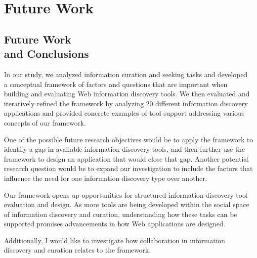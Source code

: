 \chapter{Future Work}
\label{chapter:future_work}

{\section{Future Work \\ and Conclusions }
In our study, we analyzed information curation and seeking tasks and developed a conceptual framework of factors and questions that are important when building and evaluating Web information discovery tools. We then evaluated and iteratively refined the framework by analyzing 20 different information discovery applications and provided concrete examples of tool support addressing various concepts of our framework.

One of the possible future research objectives would be to apply the framework to identify a gap in available information discovery tools, and then further use the framework to design an application that would close that gap. Another potential research question would be to expand our investigation to include the factors that influence the need for one information discovery type over another. 

Our framework opens up opportunities for structured information discovery tool evaluation and design. As more tools are being developed within the social space of information discovery and curation, understanding how these tasks can be supported promises advancements in how Web applications are designed.

Additionally, I would like to investigate how collaboration in information discovery and curation relates to the framework.

} %